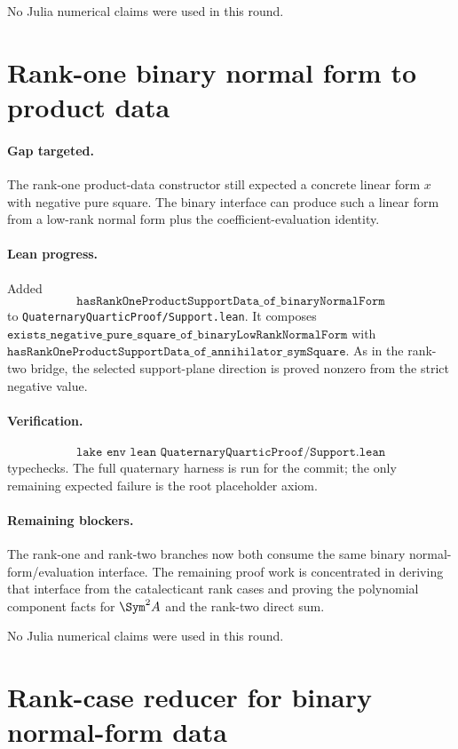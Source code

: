 \documentclass[11pt]{article}
\begin{document}
No Julia numerical claims were used in this round.

\section*{Rank-one binary normal form to product data}

\paragraph{Gap targeted.}
The rank-one product-data constructor still expected a concrete linear form
\(x\) with negative pure square.  The binary interface can produce such a
linear form from a low-rank normal form plus the coefficient-evaluation
identity.

\paragraph{Lean progress.}
Added
\[
\texttt{hasRankOneProductSupportData\_of\_binaryNormalForm}
\]
to \texttt{QuaternaryQuarticProof/Support.lean}.  It composes
\(\texttt{exists\_negative\_pure\_square\_of\_binaryLowRankNormalForm}\) with
\(\texttt{hasRankOneProductSupportData\_of\_annihilator\_symSquare}\).  As in
the rank-two bridge, the selected support-plane direction is proved nonzero
from the strict negative value.

\paragraph{Verification.}
\[
\texttt{lake env lean QuaternaryQuarticProof/Support.lean}
\]
typechecks.  The full quaternary harness is run for the commit; the only
remaining expected failure is the root placeholder axiom.

\paragraph{Remaining blockers.}
The rank-one and rank-two branches now both consume the same binary
normal-form/evaluation interface.  The remaining proof work is concentrated in
deriving that interface from the catalecticant rank cases and proving the
polynomial component facts for \(\Sym^2 A\) and the rank-two direct sum.

No Julia numerical claims were used in this round.

\section*{Rank-case reducer for binary normal-form data}
\end{document}

